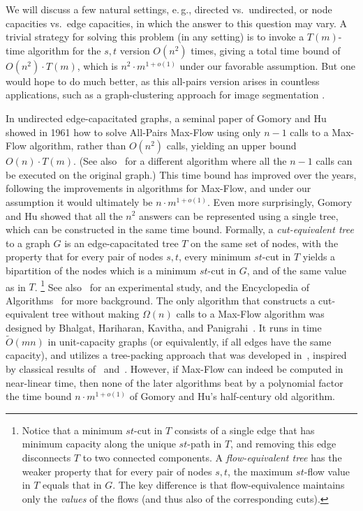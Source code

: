 \documentclass[11pt]{article}
\numberwithin{equation}{section}
\theoremstyle{definition}
\theoremstyle{plain}
\newcommand{\eg}{e.\,g.}
\theoremstyle{plain}
\newcommand{\ProblemName}[1]{\textsf{#1}}
\newcommand{\MF}{\ProblemName{Max-Flow}\xspace}
\newcommand{\APMF}{\ProblemName{All-Pairs Max-Flow}\xspace}
\newcommand\tO{\ensuremath{\widetilde O}}  %
\begin{document}
We will discuss a few natural settings,
\eg, directed vs.\ undirected, or node capacities vs.\ edge capacities,
in which the answer to this question may vary.
A trivial strategy for solving this problem (in any setting)
is to invoke a $T(m)$-time algorithm for the $s,t$ version $O(n^2)$ times,
giving a total time bound of $O(n^2)\cdot T(m)$,
which is $n^2 \cdot m^{1+o(1)}$ under our favorable assumption.
But one would hope to do much better,
as this all-pairs version arises in countless applications,
such as a graph-clustering approach for image segmentation \cite{WL93}.


In undirected edge-capacitated graphs,
a seminal paper of Gomory and Hu~\cite{GH61} showed in 1961 how to solve \APMF
using only $n-1$ calls to a \MF algorithm, rather than $O(n^2)$ calls,
yielding an upper bound $O(n) \cdot T(m)$.
(See also~\cite{Gusfield90} for a different algorithm
where all the $n-1$ calls can be executed on the original graph.)
This time bound has improved over the years,
following the improvements in algorithms for \MF,
and under our assumption it would ultimately be $n\cdot m^{1+o(1)}$.
Even more surprisingly, Gomory and Hu showed that all the $n^2$ answers
can be represented using a single tree,
which can be constructed in the same time bound.
Formally,
%
a   %
\emph{cut-equivalent tree} to a graph $G$
is an edge-capacitated tree $T$ on the same set of nodes,
with the property that for every pair of nodes $s,t$,
every minimum $st$-cut in $T$ yields a bipartition of the nodes
which is a minimum $st$-cut in $G$, and of the same value as in $T$.%
\footnote{Notice that a minimum $st$-cut in $T$ consists of a
  single edge that has minimum capacity along the unique $st$-path in $T$,
  and removing this edge disconnects $T$ to two connected components.
  A \emph{flow-equivalent tree} has the weaker property that
  for every pair of nodes $s,t$,
  the maximum $st$-flow value in $T$ equals that in $G$.
  The key difference is that flow-equivalence maintains only the \emph{values}
  of the flows (and thus also of the corresponding cuts).
}
See also~\cite{GT01} for an experimental study,
and the Encyclopedia of Algorithms~\cite{Panigrahi16} for more background.
The only algorithm that constructs a cut-equivalent tree
without making $\Omega(n)$ calls to a \MF algorithm
was designed by Bhalgat, Hariharan, Kavitha, and Panigrahi~\cite{BHKP07}.
It runs in time %
${\tO}(mn)$    %
in unit-capacity graphs
(or equivalently, if all edges have the same capacity),
and utilizes a tree-packing approach that was developed in~\cite{Cole03,HKP07},
inspired by classical results of~\cite{Gabow95} and~\cite{Edmonds70}.
However, if \MF can indeed be computed in near-linear time,
then none of the later algorithms beat by a polynomial factor
the time bound $n\cdot m^{1+o(1)}$ of Gomory and Hu's half-century old algorithm.
\end{document}
